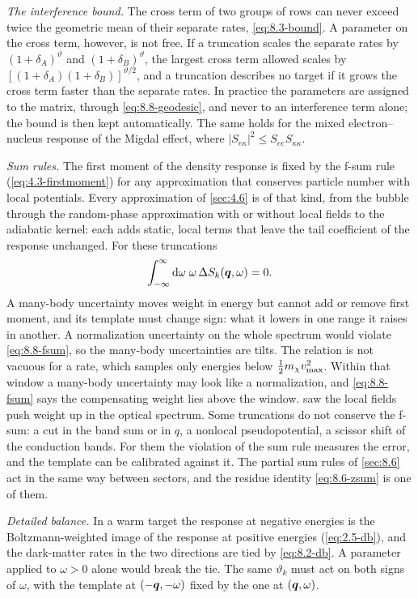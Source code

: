\emph{The interference bound.} The cross term of two groups of rows can never exceed twice the geometric mean of their separate rates, \cref{eq:8.3-bound}. A parameter on the cross term, however, is not free. If a truncation scales the separate rates by $(1 + \delta_A)^{\vartheta}$ and $(1 + \delta_B)^{\vartheta}$, the largest cross term allowed scales by $[(1 + \delta_A)(1 + \delta_B)]^{\vartheta/2}$, and a truncation describes no target if it grows the cross term faster than the separate rates. In practice the parameters are assigned to the matrix, through \cref{eq:8.8-geodesic}, and never to an interference term alone; the bound is then kept automatically. The same holds for the mixed electron--nucleus response of the Migdal effect, where $|S_{e\kappa}|^2 \le S_{ee}S_{\kappa\kappa}$.

\emph{Sum rules.} The first moment of the density response is fixed by the f-sum rule (\cref{eq:4.3-firstmoment}) for any approximation that conserves particle number with local potentials. Every approximation of \cref{sec:4.6} is of that kind, from the bubble through the random-phase approximation with or without local fields to the adiabatic kernel: each adds static, local terms that leave the tail coefficient of the response unchanged. For these truncations
\begin{equation}
  \int_{-\infty}^{\infty}\mathrm{d}\omega\;\omega\,\Delta S_k(\bm{q},\omega) = 0 .
  \label{eq:8.8-fsum}
\end{equation}
A many-body uncertainty moves weight in energy but cannot add or remove first moment, and its template must change sign: what it lowers in one range it raises in another. A normalization uncertainty on the whole spectrum would violate \cref{eq:8.8-fsum}, so the many-body uncertainties are tilts. The relation is not vacuous for a rate, which samples only energies below $\tfrac12m_{\chi} v_{\mathrm{max}}^2$. Within that window a many-body uncertainty may look like a normalization, and \cref{eq:8.8-fsum} says the compensating weight lies above the window.  saw the local fields push weight up in the optical spectrum. Some truncations do not conserve the f-sum: a cut in the band sum or in $q$, a nonlocal pseudopotential, a scissor shift of the conduction bands. For them the violation of the sum rule measures the error, and the template can be calibrated against it. The partial sum rules of \cref{sec:8.6} act in the same way between sectors, and the residue identity \cref{eq:8.6-zsum} is one of them.

\emph{Detailed balance.} In a warm target the response at negative energies is the Boltzmann-weighted image of the response at positive energies (\cref{eq:2.5-db}), and the dark-matter rates in the two directions are tied by \cref{eq:8.2-db}. A parameter applied to $\omega > 0$ alone would break the tie. The same $\vartheta_k$ must act on both signs of $\omega$, with the template at $(-\bm{q},-\omega)$ fixed by the one at $(\bm{q},\omega)$.

